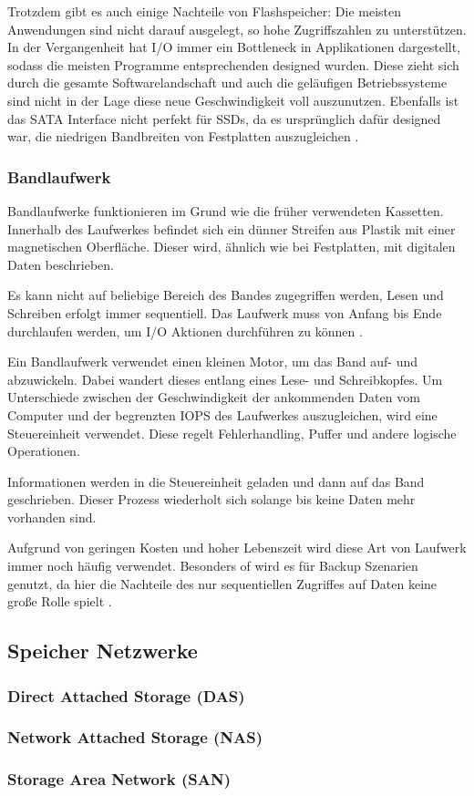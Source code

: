 Trotzdem gibt es auch einige Nachteile von Flashspeicher: Die meisten Anwendungen sind nicht darauf ausgelegt, so hohe Zugriffszahlen zu unterstützen. In der Vergangenheit hat I/O immer ein Bottleneck in Applikationen dargestellt, sodass die meisten Programme entsprechenden designed wurden.
Diese zieht sich durch die gesamte Softwarelandschaft und auch die geläufigen Betriebssysteme sind nicht in der Lage diese neue Geschwindigkeit voll auszunutzen. Ebenfalls ist das SATA Interface nicht perfekt für SSDs, da es ursprünglich dafür designed war, die niedrigen Bandbreiten von Festplatten auszugleichen \parencite[Kap. 3]{kaufmann.2016}.


\subsubsection{Bandlaufwerk}

Bandlaufwerke funktionieren im Grund wie die früher verwendeten Kassetten. Innerhalb des Laufwerkes befindet sich ein dünner Streifen aus Plastik mit einer magnetischen Oberfläche. Dieser wird, ähnlich wie bei Festplatten, mit digitalen Daten beschrieben. 

Es kann nicht auf beliebige Bereich des Bandes zugegriffen werden, Lesen und Schreiben erfolgt immer sequentiell. Das Laufwerk muss von Anfang bis Ende durchlaufen werden, um I/O Aktionen durchführen zu können \parencite{adrc.2009}.

Ein Bandlaufwerk verwendet einen kleinen Motor, um das Band auf- und abzuwickeln. Dabei wandert dieses entlang eines Lese- und Schreibkopfes. Um Unterschiede zwischen der Geschwindigkeit der ankommenden Daten vom Computer und der begrenzten \gls{IOPS} des Laufwerkes auszugleichen, wird eine Steuereinheit verwendet. Diese regelt Fehlerhandling, Puffer und andere logische Operationen.

Informationen werden in die Steuereinheit geladen und dann auf das Band geschrieben. Dieser Prozess wiederholt sich solange bis keine Daten mehr vorhanden sind.

Aufgrund von geringen Kosten und hoher Lebenszeit wird diese Art von Laufwerk immer noch häufig verwendet. Besonders of wird es für Backup Szenarien genutzt, da hier die Nachteile des nur sequentiellen Zugriffes auf Daten keine große Rolle spielt \parencite{adrc.2009}. 

\subsection{Speicher Netzwerke}
\subsubsection{Direct Attached Storage (DAS)}
\subsubsection{Network Attached Storage (NAS)}
\subsubsection{Storage Area Network (SAN)}



